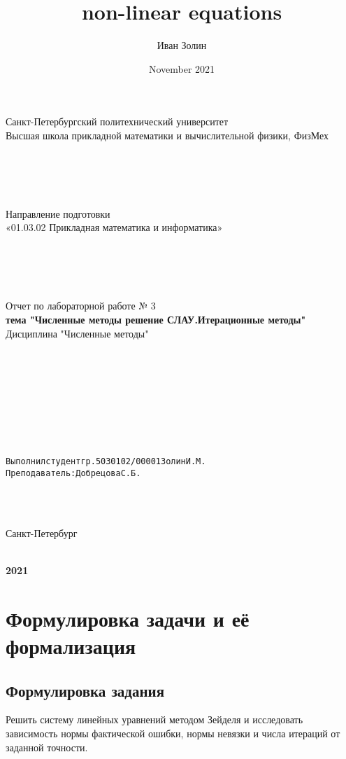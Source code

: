 \documentclass{article}
\title{non-linear equations}
\author{Иван Золин}
\date{November 2021}
\begin{document}
	
	\large
	\begin{center}
		
		Санкт-Петербургский политехнический университет\\
		Высшая школа прикладной математики и вычислительной физики, ФизМех
		
		~\\
		~\\
		~\\
		~\\
		Направление подготовки\\
		«01.03.02 Прикладная математика и информатика»
		
		~\\
		~\\
		~\\
		~\\
		Отчет по лабораторной работе № 3\\
		\textbf{тема "Численные методы решение СЛАУ.Итерационные методы"}	
		~\\	Дисциплина "Численные методы"
	\end{center}
	
	~\\
	~\\
	~\\
	~\\
	~\\
	~\\
	~\\
	\begin{alltt}
		Выполнил студент гр. 5030102/00001			  		   		  Золин И.М.
		Преподаватель: 				              	        	Добрецова С.Б.
	\end{alltt}
	
	~\\
	~\\
	\begin{center}
		Санкт-Петербург
		
		~\\
		\textbf{2021}
	\end{center}{}
	
	\newpage
	
		\section{Формулировка задачи и её формализация}
		\subsection{Формулировка задания}
	Решить систему линейных уравнений методом Зейделя и исследовать зависимость нормы фактической ошибки, нормы невязки и числа итераций от заданной точности.
	~\\
\end{document}
